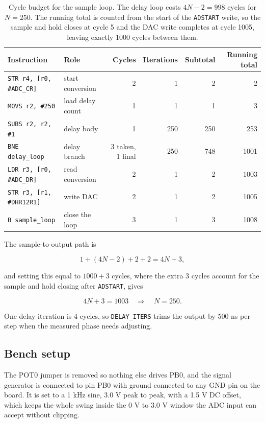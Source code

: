 \documentclass[11pt]{article}
\begin{document}
\begin{table}[h]
\centering
\begin{tabular}{llrrrr}
\toprule
Instruction & Role & Cycles & Iterations & Subtotal & Running total \\
\midrule
\texttt{STR r4, [r0, \#ADC\_CR]} & start conversion & 2 & 1 & 2 & 2 \\
\texttt{MOVS r2, \#250} & load delay count & 1 & 1 & 1 & 3 \\
\texttt{SUBS r2, r2, \#1} & delay body & 1 & 250 & 250 & 253 \\
\texttt{BNE delay\_loop} & delay branch & 3 taken, 1 final & 250 & 748 & 1001 \\
\texttt{LDR r3, [r0, \#ADC\_DR]} & read conversion & 2 & 1 & 2 & 1003 \\
\texttt{STR r3, [r1, \#DHR12R1]} & write DAC & 2 & 1 & 2 & 1005 \\
\texttt{B sample\_loop} & close the loop & 3 & 1 & 3 & 1008 \\
\bottomrule
\end{tabular}
\caption{Cycle budget for the sample loop. The delay loop costs $4N-2 = 998$
cycles for $N = 250$. The running total is counted from the start of the
\texttt{ADSTART} write, so the sample and hold closes at cycle 5 and the DAC
write completes at cycle 1005, leaving exactly 1000 cycles between them.}
\label{tab:cycles}
\end{table}

The sample-to-output path is

\[
1 + (4N - 2) + 2 + 2 = 4N + 3,
\]

and setting this equal to $1000 + 3$ cycles, where the extra 3 cycles account
for the sample and hold closing after \texttt{ADSTART}, gives

\[
4N + 3 = 1003 \quad \Rightarrow \quad N = 250.
\]

One delay iteration is 4 cycles, so \texttt{DELAY\_ITERS} trims the output by
500 ns per step when the measured phase needs adjusting.

\subsection{Bench setup}

The POT0 jumper is removed so nothing else drives PB0, and the signal generator
is connected to pin PB0 with ground connected to any GND pin on the board. It is set to a 1 kHz sine, 3.0 V peak to
peak, with a 1.5 V DC offset, which keeps the whole swing inside the 0 V to
3.0 V window the ADC input can accept without clipping.
\end{document}
